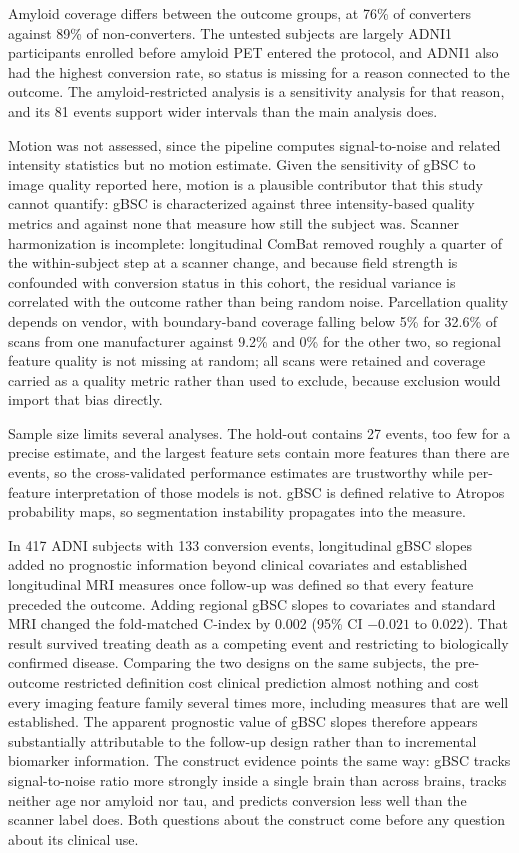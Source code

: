 \documentclass[blue]{ludusofficial}  %
\begin{document}
Amyloid coverage differs between the outcome groups, at 76\% of converters against 89\% of non-converters. The untested subjects are largely ADNI1 participants enrolled before amyloid PET entered the protocol, and ADNI1 also had the highest conversion rate, so status is missing for a reason connected to the outcome. The amyloid-restricted analysis is a sensitivity analysis for that reason, and its 81 events support wider intervals than the main analysis does.

Motion was not assessed, since the pipeline computes signal-to-noise and related intensity statistics but no motion estimate. Given the sensitivity of gBSC to image quality reported here, motion is a plausible contributor that this study cannot quantify: gBSC is characterized against three intensity-based quality metrics and against none that measure how still the subject was. Scanner harmonization is incomplete: longitudinal ComBat removed roughly a quarter of the within-subject step at a scanner change, and because field strength is confounded with conversion status in this cohort, the residual variance is correlated with the outcome rather than being random noise. Parcellation quality depends on vendor, with boundary-band coverage falling below 5\% for 32.6\% of scans from one manufacturer against 9.2\% and 0\% for the other two, so regional feature quality is not missing at random; all scans were retained and coverage carried as a quality metric rather than used to exclude, because exclusion would import that bias directly.

Sample size limits several analyses. The hold-out contains 27 events, too few for a precise estimate, and the largest feature sets contain more features than there are events, so the cross-validated performance estimates are trustworthy while per-feature interpretation of those models is not. gBSC is defined relative to Atropos probability maps, so segmentation instability propagates into the measure.

In 417 ADNI subjects with 133 conversion events, longitudinal gBSC slopes added no prognostic information beyond clinical covariates and established longitudinal MRI measures once follow-up was defined so that every feature preceded the outcome. Adding regional gBSC slopes to covariates and standard MRI changed the fold-matched C-index by 0.002 (95\% CI $-0.021$ to $0.022$). That result survived treating death as a competing event and restricting to biologically confirmed disease. Comparing the two designs on the same subjects, the pre-outcome restricted definition cost clinical prediction almost nothing and cost every imaging feature family several times more, including measures that are well established. The apparent prognostic value of gBSC slopes therefore appears substantially attributable to the follow-up design rather than to incremental biomarker information. The construct evidence points the same way: gBSC tracks signal-to-noise ratio more strongly inside a single brain than across brains, tracks neither age nor amyloid nor tau, and predicts conversion less well than the scanner label does. Both questions about the construct come before any question about its clinical use.
\end{document}
